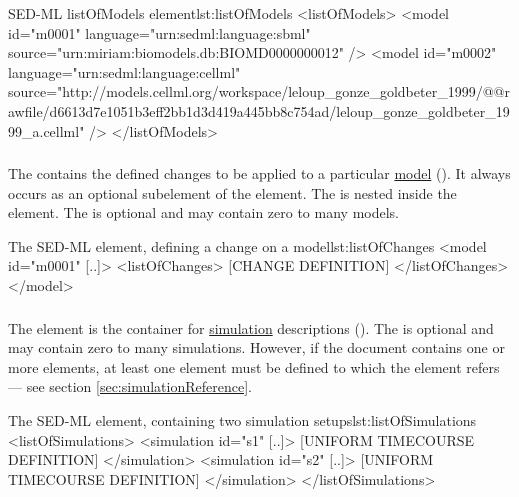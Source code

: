 
\begin{myXmlLst}{SED-ML listOfModels element}{lst:listOfModels}
<listOfModels>
	<model id="m0001" language="urn:sedml:language:sbml" 
		source="urn:miriam:biomodels.db:BIOMD0000000012" />
	<model id="m0002" language="urn:sedml:language:cellml" 
		source="http://models.cellml.org/workspace/leloup_gonze_goldbeter_1999/@@rawfile/d6613d7e1051b3eff2bb1d3d419a445bb8c754ad/leloup_gonze_goldbeter_1999_a.cellml" />
</listOfModels>
\end{myXmlLst}


\subsubsection{}
\label{sec:listOfChanges}
The  contains the defined changes to be applied to a particular \hyperref[class:model]{model} (). It always occurs as an optional subelement of the  element. The  is nested inside the  element. The  is optional and may contain zero to many models.


\begin{myXmlLst}{The SED-ML  element, defining a change on a model}{lst:listOfChanges}
<model id="m0001" [..]>
	<listOfChanges>
		[CHANGE DEFINITION]
	</listOfChanges>
</model>
\end{myXmlLst}


\subsubsection{}
\label{sec:listOfSimulations}
The  element is the container for \hyperref[class:simulation]{simulation} descriptions (). The  is optional and may contain zero to many simulations. However, if the \currentLV document contains one or more  elements, at least one  element must be defined to which  the  element refers --- see section \ref{sec:simulationReference}.


\begin{myXmlLst}{The SED-ML  element, containing two simulation setups}{lst:listOfSimulations}
<listOfSimulations>
	<simulation id="s1" [..]>
		[UNIFORM TIMECOURSE DEFINITION]
	</simulation>
	<simulation id="s2" [..]>
   		[UNIFORM TIMECOURSE DEFINITION]
	</simulation>
</listOfSimulations>
\end{myXmlLst}


